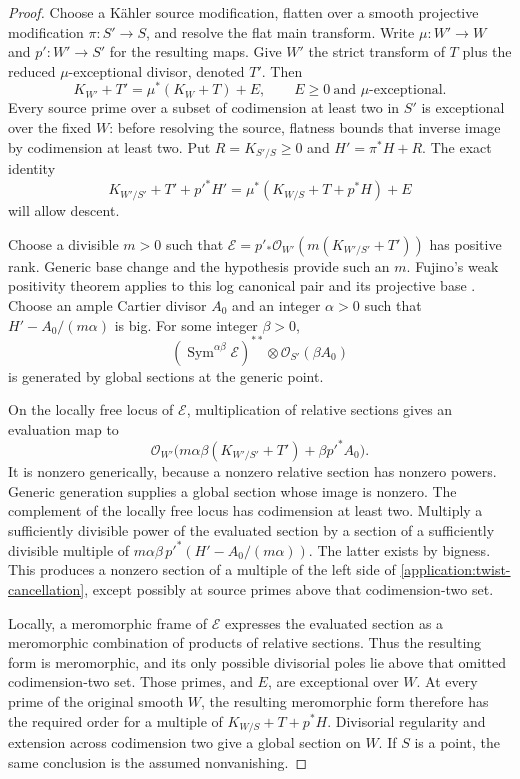 \begin{proof}
Choose a K\"ahler source modification, flatten over a smooth
projective modification $\pi:S'\to S$, and resolve the flat main
transform. Write $\mu:W'\to W$ and $p':W'\to S'$ for the
resulting maps. Give $W'$ the strict transform of $T$ plus the
reduced $\mu$-exceptional divisor, denoted $T'$. Then
\begin{equation}\label{application:source-discrepancy}
 K_{W'}+T'=\mu^*(K_W+T)+E,
 \qquad E\geq0\ \text{and $\mu$-exceptional}.
\end{equation}
Every source prime over a subset of codimension at least two in
$S'$ is exceptional over the fixed $W$: before resolving the
source, flatness bounds that inverse image by codimension at least
two. Put $R=K_{S'/S}\geq0$ and $H'=\pi^*H+R$. The exact identity
\begin{equation}\label{application:twist-cancellation}
 K_{W'/S'}+T'+p'^*H'
 =\mu^*(K_{W/S}+T+p^*H)+E
\end{equation}
will allow descent.

Choose a divisible $m>0$ such that
$\mathcal E=p'_*\mathcal O_{W'}(m(K_{W'/S'}+T'))$ has positive
rank. Generic base change and the hypothesis provide such an $m$.
Fujino's weak positivity theorem applies to this log canonical pair
and its projective base \cite[Theorem~1.1]{FujinoWeakPositivity}.
Choose an ample Cartier divisor $A_0$ and an integer $\alpha>0$
such that $H'-A_0/(m\alpha)$ is big. For some integer $\beta>0$,
\[
 (\operatorname{Sym}^{\alpha\beta}\mathcal E)^{**}
        \otimes\mathcal O_{S'}(\beta A_0)
\]
is generated by global sections at the generic point.

On the locally free locus of $\mathcal E$, multiplication of
relative sections gives an evaluation map to
\[
 \mathcal O_{W'}\bigl(m\alpha\beta(K_{W'/S'}+T')
                         +\beta p'^*A_0\bigr).
\]
It is nonzero generically, because a nonzero relative section has
nonzero powers. Generic generation supplies a global section whose
image is nonzero. The complement of the locally free locus has
codimension at least two. Multiply a sufficiently divisible power
of the evaluated section by a section of a sufficiently divisible
multiple of
$m\alpha\beta\,p'^*(H'-A_0/(m\alpha))$.
The latter exists by bigness. This produces a nonzero section of a
multiple of the left side of \eqref{application:twist-cancellation}, except possibly
at source primes above that codimension-two set.

Locally, a meromorphic frame of $\mathcal E$ expresses the evaluated
section as a meromorphic combination of products of relative
sections. Thus the resulting form is meromorphic, and its only
possible divisorial poles lie above that omitted codimension-two set.
Those primes, and $E$, are exceptional over $W$. At every prime
of the original smooth $W$, the resulting meromorphic form therefore
has the required order for a multiple of $K_{W/S}+T+p^*H$.
Divisorial regularity and extension across codimension two give a
global section on $W$. If $S$ is a point, the same conclusion is
the assumed nonvanishing.
\end{proof}

